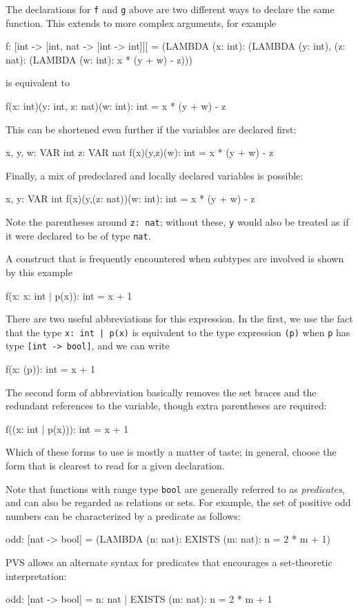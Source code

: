The declarations for \texttt{f} and \texttt{g} above are two different ways to
declare the same function.  This extends to more complex arguments, for
example
\begin{pvsex}
  f: [int -> [int, nat -> [int -> int]]] =
     (LAMBDA (x: int): (LAMBDA (y: int), (z: nat): (LAMBDA (w: int):
       x * (y + w) - z)))
\end{pvsex}
%
is equivalent to
\begin{pvsex}
  f(x: int)(y: int, z: nat)(w: int): int = x * (y + w) - z
\end{pvsex}
%
This can be shortened even further if the variables are declared first:
\begin{pvsex}
  x, y, w: VAR int
  z: VAR nat
  f(x)(y,z)(w): int = x * (y + w) - z
\end{pvsex}
%
Finally, a mix of predeclared and locally declared variables is possible:
\begin{pvsex}
  x, y: VAR int
  f(x)(y,(z: nat))(w: int): int = x * (y + w) - z
\end{pvsex}
%
Note the parentheses around \texttt{z:\ nat}; without these, \texttt{y} would
also be treated as if it were declared to be of type \texttt{nat}.

A construct that is frequently encountered when subtypes are involved is
shown by this example
\begin{pvsex}
  f(x: \setb{}x: int | p(x)\sete): int = x + 1
\end{pvsex}
%
There are two useful abbreviations for this expression.  In the first, we
use the fact that the type \texttt{\setb{}x:\ int | p(x)\sete} is equivalent to
the type expression \texttt{(p)} when \texttt{p} has type \texttt{[int ->
bool]}, and we can write
\begin{pvsex}
  f(x: (p)): int = x + 1
\end{pvsex}
%
The second form of abbreviation basically removes the set braces and the
redundant references to the variable, though extra parentheses are
required:
\begin{pvsex}
  f((x: int | p(x))): int = x + 1
\end{pvsex}
%
Which of these forms to use is mostly a matter of taste; in general,
choose the form that is clearest to read for a given declaration.

Note that functions with range type \texttt{bool} are generally referred
to as \emph{predicates}, and can also be regarded as relations or sets.
For example, the set of positive odd numbers can be characterized by a
predicate as follows:
\begin{pvsex}
  odd: [nat -> bool] = (LAMBDA (n: nat): EXISTS (m: nat): n = 2 * m + 1)
\end{pvsex}
%
PVS allows an alternate syntax for predicates that encourages a
set-theoretic interpretation:
\begin{pvsex}
  odd: [nat -> bool] = \setb{}n: nat | EXISTS (m: nat): n = 2 * m + 1\sete
\end{pvsex}

